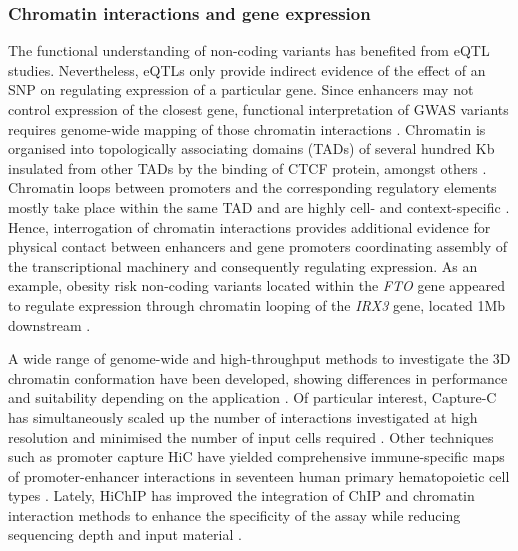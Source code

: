 \subsubsection{Chromatin interactions and gene expression}
The functional understanding of non-coding variants has benefited from eQTL studies. Nevertheless, eQTLs only provide indirect evidence of the effect of an SNP on regulating expression of a particular gene. Since enhancers may not control expression of the closest gene, functional interpretation of GWAS variants requires genome-wide mapping of those chromatin interactions \parencite{Smemo2014}.  Chromatin is organised into topologically associating domains (TADs) of several hundred Kb insulated from other TADs by the binding of CTCF protein, amongst others \parencite{Nora2017}. Chromatin loops between promoters and the corresponding regulatory elements mostly take place within the same TAD and are highly cell- and context-specific \parencite{Smith2016}. Hence, interrogation of chromatin interactions provides additional evidence for physical contact between enhancers and gene promoters coordinating assembly of the transcriptional machinery and consequently regulating expression. As an example, obesity risk non-coding variants located within the \textit{FTO} gene appeared to regulate expression through chromatin looping of the \textit{IRX3} gene, located 1Mb downstream \parencite{Smemo2014}.

A wide range of genome-wide and high-throughput methods to investigate the 3D chromatin conformation have been developed, showing differences in performance and suitability depending on the application \parencite{Davies2017}. Of particular interest, Capture-C has simultaneously scaled up the number of interactions investigated at high resolution and minimised the number of input cells required \parencite{Davies2016,Oudelaar2017}. Other techniques such as promoter capture HiC have yielded comprehensive immune-specific maps of promoter-enhancer interactions in seventeen human primary hematopoietic cell types \parencite{Javierre2016}. Lately, HiChIP has improved the integration of ChIP and chromatin interaction methods to enhance the specificity of the assay while reducing sequencing depth and input material \parencite{Mumbach2016}. 



